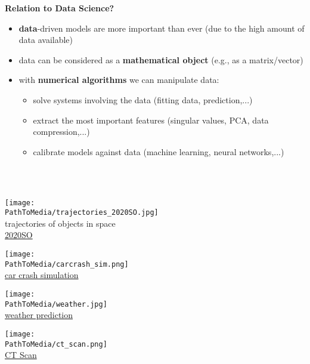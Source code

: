 %
\begin{frame}
	\textbf{\color{header} Relation to Data Science?}~\\
	\begin{itemize}
		\item \textbf{data}-driven models are more important than ever (due to the high amount of data available) \vspace{0.2cm}
		\item data can be considered
		as a \textbf{mathematical object} (e.g., as a matrix/vector) \vspace{0.2cm}
		\item with \textbf{numerical algorithms} we can manipulate data:\vspace{0.2cm}
		\begin{itemize}\normalsize
			\item solve systems involving the data (fitting data, prediction,...)
			\vspace{0.2cm}\item extract the most important features (singular values, PCA, data compression,...) 
			\vspace{0.2cm}\item calibrate models against data (machine learning, neural networks,...)
		\end{itemize}
	\end{itemize}
	
	~\\~\\
	\begin{minipage}[t]{0.25\textwidth}\centering
		\texttt{[image: \\PathToMedia/trajectories\_2020SO.jpg]}\\
		trajectories of objects in space \\
		\hyperref{https://en.wikipedia.org/wiki/2020_SO\#/media/File:2020SO_b.gif}{}{}{2020SO} 
	\end{minipage}
	\begin{minipage}[t]{0.25\textwidth}\centering
		\texttt{[image: \\PathToMedia/carcrash\_sim.png]}\\
		\hyperref{https://www.emi.fraunhofer.de/en/business-units/automotive/research/Roentgen-Crashtest.html}{}{}{car crash simulation} 
	\end{minipage}
	\begin{minipage}[t]{0.25\textwidth}\centering
		\texttt{[image: \\PathToMedia/weather.jpg]}\\
		\hyperref{https://en.wikipedia.org/wiki/Numerical_weather_prediction}{}{}{weather prediction} 
	\end{minipage}
	\begin{minipage}[t]{0.25\textwidth} \centering
		\texttt{[image: \\PathToMedia/ct\_scan.png]}\\
		\hyperref{https://en.wikipedia.org/wiki/CT_scan}{}{}{CT Scan} 
	\end{minipage}
\end{frame}
